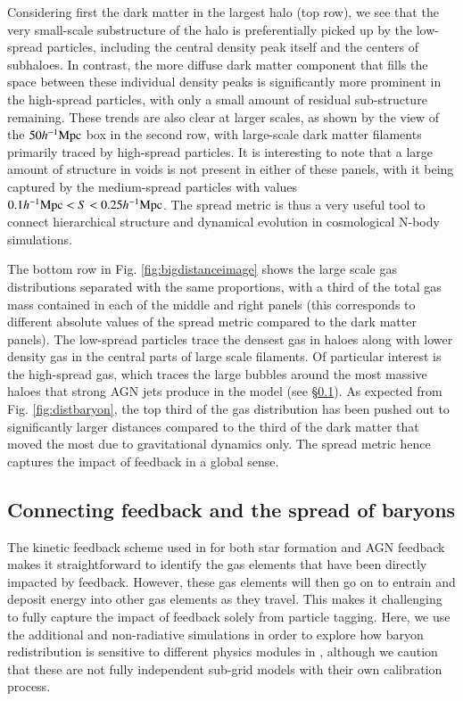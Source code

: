 Considering first the dark matter in the largest halo (top row), we see that
the very small-scale substructure of the halo is preferentially picked up by
the low-spread particles, including the central density peak itself and the
centers of subhaloes. In contrast, the more diffuse dark matter component that
fills the space between these individual density peaks is significantly more
prominent in the high-spread particles, with only a small amount of residual
sub-structure remaining. These trends are also clear at larger scales, as
shown by the view of the $50h^{-1}{\rm Mpc}{}$ box in the second row, with large-scale
dark matter filaments primarily traced by high-spread particles. It is
interesting to note that a large amount of structure in voids is not present
in either of these panels, with it being captured by the medium-spread
particles with values $0.1h^{-1}{\rm Mpc}{} < S < 0.25 h^{-1}{\rm Mpc}{}$. The spread
metric is thus a very useful tool to connect hierarchical structure and
dynamical evolution in cosmological N-body simulations.

The bottom row in Fig. \ref{fig:bigdistanceimage} shows the large scale gas
distributions separated with the same proportions, with a third of the total
gas mass contained in each of the middle and right panels (this corresponds
to different absolute values of the spread metric compared to the dark matter
panels). The low-spread particles trace the densest gas in haloes along with
lower density gas in the central parts of large scale filaments. Of
particular interest is the high-spread gas, which traces the large bubbles
around the most massive haloes that strong AGN jets produce in the \simba{}
model (see \S \ref{sec:fullmodelfeedback}). As expected from Fig.
\ref{fig:distbaryon}, the top third of the gas distribution has been pushed out
to significantly larger distances compared to the third of the dark matter that
moved the most due to gravitational dynamics only. The spread metric hence 
captures the impact of feedback in a global sense.

\subsection{Connecting feedback and the spread of baryons}
\label{sec:fullmodelfeedback}

The kinetic feedback scheme used in \simba{} for both star formation and AGN
feedback makes it straightforward to identify the gas elements that have been
directly impacted by feedback. However, these gas elements will then go on to
entrain and deposit energy into other gas elements as they travel. This makes
it challenging to fully capture the impact of feedback solely from particle
tagging. Here, we use the additional \nojet{} and non-radiative simulations
in order to explore how baryon redistribution is sensitive to different
physics modules in \simba{}, although we caution that these are not fully
independent sub-grid models with their own calibration process.

